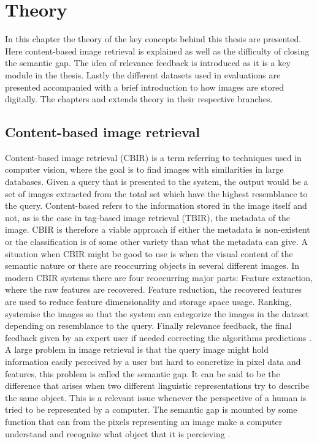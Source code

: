 
\chapter{Theory}
\label{chapter:cbirtheory}
In this chapter the theory of the key concepts behind this thesis are presented. Here content-based image retrieval is explained as well as the difficulty of closing the semantic gap. The idea of relevance feedback is introduced as it is a key module in the thesis. Lastly the different datasets used in evaluations are presented accompanied with a brief introduction to how images are stored digitally. 
The chapters \emph{} and \emph{} extends theory in their respective branches.

\section{Content-based image retrieval}

Content-based image retrieval (CBIR) is a term referring to techniques used in computer vision, where the goal is to find images with similarities in large databases. Given a query that is presented to the system, the output would be a set of images extracted from the total set which have the highest resemblance to the query. Content-based refers to the information stored in the image itself and not, as is the case in tag-based image retrieval (TBIR), the metadata of the image. CBIR is therefore a viable approach if either the metadata is non-existent or the classification is of some other variety than what the metadata can give. A situation when CBIR might be good to use is when the visual content of the semantic nature or there are reoccurring objects in several different images. In modern CBIR systems there are four reoccurring major parts: Feature extraction, where the raw features are recovered. Feature reduction, the recovered features are used to reduce feature dimensionality and storage space usage. Ranking, systemise the images so that the system can categorize the images in the dataset depending on resemblance to the query. Finally relevance feedback, the final feedback given by an expert user if needed correcting the algorithms predictions \cite{kundu2015graph}. A large problem in image retrieval is that the query image might hold information easily perceived by a user but hard to concretize in pixel data and features, this problem is called the semantic gap. It can be said to be the difference that arises when two different linguistic representations try to describe the same object. This is a relevant issue whenever the perspective of a human is tried to be represented by a computer. The semantic gap is mounted by some function that can from the pixels representing an image make a computer understand and recognize what object that it is percieving \cite{smeulders2000semantic}.


